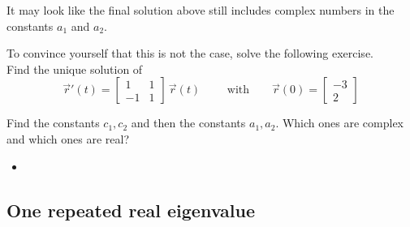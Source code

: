 \begin{graybox}
	It may look like the final solution above still includes complex numbers in the constants $a_1$ and $a_2$. 
	
	To convince yourself that this is not the case, solve the following exercise.\\
	
	Find the unique solution of
	$$
	\vec{r}'(t) = \begin{bmatrix}	
 		1 & 1 \\ -1 & 1
		\end{bmatrix} 
		\, \vec{r}(t)
	\qquad \text{ with} \qquad
	\vec{r}(0) = \begin{bmatrix}
 			-3 \\ 2
	 \end{bmatrix}
	 $$
	 
	 Find the constants $c_1, c_2$ and then the constants $a_1,a_2$. Which ones are complex and which ones are real?
\end{graybox}

\begin{video}
	\begin{itemize}
		\item {}
	\end{itemize}
\end{video}




\subsection{One repeated real eigenvalue}


